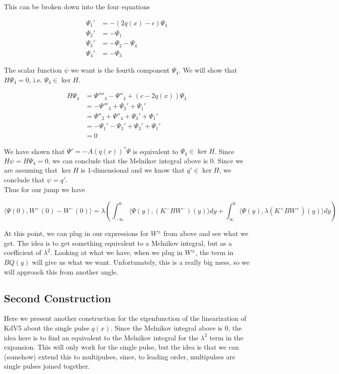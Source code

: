 \documentclass[12pt]{article}
\begin{document}
This can be broken down into the four equations

\begin{align*}
\Psi_1' &= -(2q(x) - c) \Psi_4 \\
\Psi_2' &= -\Psi_1 \\
\Psi_3' &= -\Psi_2 - \Psi_4 \\
\Psi_4' &= -\Psi_3
\end{align*}

The scalar function $\psi$ we want is the fourth component $\Psi_4$. We will show that $H \Psi_4 = 0$, i.e. $\Psi_4 \in \ker H$.

\begin{align*}
H \Psi_4 &= \Psi''''_4 - \Psi''_4 + (c - 2q(x))\Psi_4 \\
&= -\Psi'''_3 + \Psi_3' + \Psi_1' \\
&= \Psi''_2 + \Psi''_4 + \Psi_3' + \Psi_1' \\
&= -\Psi_1' - \Psi_3' + \Psi_3' + \Psi_1'\\
&= 0
\end{align*}

We have shown that $\Psi' = -A(q(x))^*\Psi$ is equivalent to $\Psi_4 \in \ker H$. Since $H \psi = H \Psi_4 = 0$, we can conclude that the Melnikov integral above is 0. Since we are assuming that $\ker H$ is 1-dimensional and we know that $q' \in \ker H$, we conclude that $\psi = q'$.
\\

Thus for our jump we have

\[
\langle \Psi(0), W^+(0) - W^-(0) \rangle = \lambda\left( \int_{-\infty}^0 \langle \Psi(y), (K^- B W^-)(y) \rangle dy + \int_\infty^0 \langle \Psi(y), \lambda (K^+ B W^+)(y) \rangle dy \right) 
\]

At this point, we can plug in our expressions for $W^\pm$ from above and see what we get. The idea is to get something equivalent to a Melnikov integral, but as a coefficient of $\lambda^2$. Looking at what we have, when we plug in $W^\pm$, the term in $BQ(y)$ will give us what we want. Unfortunately, this is a really big mess, so we will approach this from another angle.

\subsection*{Second Construction}

Here we present another construction for the eigenfunction of the linearization of KdV5 about the single pulse $q(x)$. Since the Melnikov integral above is 0, the idea here is to find an equivalent to the Melnikov integral for the $\lambda^2$ term in the expansion. This will only work for the single pulse, but the idea is that we can (somehow) extend this to multipulses, since, to leading order, multipulses are single pulses joined together.\\
\end{document}
